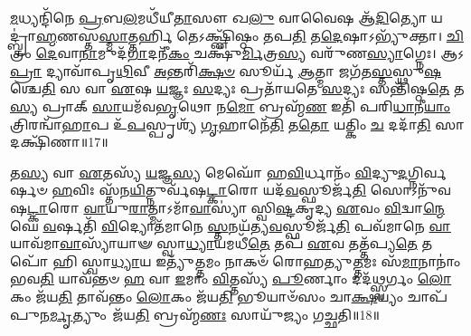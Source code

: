 \-\ul{𑌮}\-𑌧𑍍𑌯𑌨𑍍𑌦𑌿᳴𑌨𑍇 \ul{𑌪𑍍𑌰}\-𑌬\-\ul{𑌲}\-𑌮𑌧𑍀᳴𑌯𑍀\-\ul{𑌤𑌾}\-𑌸𑍗 𑌖\-\ul{𑌲𑍁} 𑌵𑌾𑌵𑍈𑌷 𑌆᳴\-\ul{𑌦𑌿}\-𑌤𑍍𑌯𑍋 𑌯𑌦𑍍𑌬𑍍𑌰𑌾॑\-\ul{𑌹𑍍𑌮}\-𑌣\-𑌸𑍍𑌤\-\ul{𑌸𑍍𑌮𑌾}\-𑌤𑍍𑌤𑌰𑍍\mbox{}\-\ul{𑌹𑌿} 𑌤𑍇𑌽𑌕𑍍𑌷𑍍𑌣𑌿᳴𑌷𑍍𑌠𑌂 𑌤𑌪\-\ul{𑌤𑌿} 𑌤\-\ul{𑌦𑍇}\-𑌷𑌾𑌽𑌭𑍍𑌯𑍁᳴𑌕𑍍𑌤𑌾। 
\-\ul{𑌚𑌿}\-𑌤𑍍𑌰𑌂 \ul{𑌦𑍇}\-𑌵𑌾\-\ul{𑌨𑌾}\-𑌮𑍁𑌦᳴\-\ul{𑌗𑌾}\-\-𑌦𑌨𑍀᳴\-\ul{𑌕𑌂} 𑌚𑌕𑍍𑌷𑍁᳴\-\ul{𑌰𑍍𑌮𑌿}\-𑌤𑍍𑌰\-\ul{𑌸𑍍𑌯} 𑌵𑌰𑍁᳴𑌣\-\ul{𑌸𑍍𑌯𑌾}\-𑌗𑍍𑌨𑍇𑌃। 
𑌆𑌽\-\ul{𑌪𑍍𑌰𑌾} 𑌦𑍍𑌯𑌾𑌵𑌾᳴𑌪𑍃\-\ul{𑌥𑌿}\-𑌵𑍀 \ul{𑌅}\-𑌨𑍍𑌤𑌰𑌿᳴\-\ul{𑌕𑍍𑌷}\-\-\ul{𑍞} 𑌸𑍂𑌰𑍍𑌯᳴ \ul{𑌆}\-𑌤𑍍𑌮𑌾 𑌜𑌗᳴𑌤\-\ul{𑌸𑍍𑌤}\-𑌸𑍍𑌥𑍁\-\ul{𑌷}\-𑌶𑍍𑌚𑍇\-\ul{𑌤𑌿} 𑌸 𑌵𑌾 \ul{𑌏}\-𑌷 \ul{𑌯}\-𑌜𑍍𑌞𑌃 \ul{𑌸}\-𑌦𑍍𑌯𑌃 𑌪𑍍𑌰𑌤𑌾᳴𑌯𑌤𑍇 \ul{𑌸}\-𑌦𑍍𑌯𑌃 𑌸𑌨𑍍𑌤𑌿᳴𑌷𑍍𑌠\-\ul{𑌤𑍇} 𑌤\-\ul{𑌸𑍍𑌯} 𑌪𑍍𑌰𑌾𑌕𑍍 \ul{𑌸𑌾}\-𑌯𑌮᳴𑌵\-\ul{𑌭𑍃}\-𑌥𑍋 𑌨\-\ul{𑌮𑍋} 𑌬𑍍𑌰𑌹𑍍𑌮᳴\-\ul{𑌣} 𑌇𑌤𑌿᳴ 𑌪𑌰𑌿\-\ul{𑌧𑌾}\-𑌨𑍀\-\ul{𑌯𑌾𑌂} 𑌤𑍍𑌰𑌿𑌰𑌨𑍍𑌵𑌾᳴\-\ul{𑌹𑌾}\-𑌪 𑌉᳴\-\ul{𑌪}\-𑌸𑍍𑌪𑍃𑌶𑍍𑌯᳴ \ul{𑌗𑍃}\-𑌹𑌾𑌨𑍇᳴\-\ul{𑌤𑌿} 𑌤\-\ul{𑌤𑍋} 𑌯𑌤𑍍𑌕𑌿𑌂 \ul{𑌚} 𑌦𑌦𑌾᳴\-\ul{𑌤𑌿} 𑌸𑌾 𑌦𑌕𑍍𑌷𑌿᳴𑌣𑌾॥17॥\anuvakamend


𑌤\-\ul{𑌸𑍍𑌯} 𑌵𑌾 \ul{𑌏}\-𑌤𑌸𑍍𑌯᳴ \ul{𑌯}\-𑌜𑍍𑌞\-\ul{𑌸𑍍𑌯} 𑌮𑍇𑌘𑍋᳴ 𑌹\-\ul{𑌵𑌿}\-𑌰𑍍𑌧𑌾𑌨𑌂᳴ \ul{𑌵𑌿}\-𑌦𑍍𑌯𑍁\-\ul{𑌦}\-𑌗𑍍𑌨𑌿𑌰𑍍\mbox{}\-\ul{𑌵}\-𑌰𑍍\mbox{}𑌷𑍞 \ul{𑌹}\-𑌵𑌿𑌃 𑌸𑍍𑌤᳴𑌨\-\ul{𑌯𑌿}\-𑌤𑍍𑌨𑍁𑌰𑍍𑌵᳴𑌷\-\ul{𑌟𑍍𑌕𑌾}\-𑌰𑍋 𑌯𑌦᳴\-\ul{𑌵}\-𑌸𑍍𑌫𑍂𑌰𑍍𑌜᳴\-\ul{𑌤𑌿} 𑌸𑍋𑌽𑌨𑍁᳴𑌵𑌷\-\ul{𑌟𑍍𑌕𑌾}\-𑌰𑍋 \ul{𑌵𑌾}\-𑌯𑍁\-\ul{𑌰𑌾}\-𑌤𑍍𑌮𑌾𑌽𑌮𑌾᳴\-\ul{𑌵𑌾}\-𑌸𑍍𑌯𑌾॑ 𑌸𑍍𑌵𑌿\-\ul{𑌷𑍍𑌟}\-𑌕𑍃𑌦𑍍𑌯 \ul{𑌏}\-𑌵𑌂 \ul{𑌵𑌿}\-𑌦𑍍𑌵𑌾\-\ul{𑌨𑍍𑌮𑍇}\-𑌘𑍇 \ul{𑌵}\-𑌰𑍍\mbox{}𑌷𑌤𑌿᳴ \ul{𑌵𑌿}\-𑌦𑍍𑌯𑍋𑌤᳴𑌮𑌾𑌨𑍇 \ul{𑌸𑍍𑌤}\-𑌨𑌯᳴𑌤𑍍𑌯\-\ul{𑌵}\-𑌸𑍍𑌫𑍂𑌰𑍍𑌜᳴\-\ul{𑌤𑌿} 𑌪𑌵᳴𑌮𑌾𑌨𑍇 \ul{𑌵𑌾}\-𑌯𑌾𑌵᳴𑌮𑌾\-\ul{𑌵𑌾}\-𑌸𑍍𑌯𑌾᳴𑌯𑌾𑍟 𑌸𑍍𑌵𑌾\-\ul{𑌧𑍍𑌯𑌾}\-𑌯𑌮𑌧𑍀᳴\-\ul{𑌤𑍇} 𑌤𑌪᳴ \ul{𑌏}\-𑌵 𑌤𑌤𑍍𑌤᳴𑌪𑍍𑌯\-\ul{𑌤𑍇} 𑌤𑌪𑍋᳴ 𑌹𑌿 𑌸𑍍𑌵𑌾\-\ul{𑌧𑍍𑌯𑌾}\-𑌯 𑌇𑌤𑍍𑌯𑍁᳴\-\ul{𑌤𑍍𑌤}\-𑌮𑌂 𑌨𑌾𑌕𑍞᳴ 𑌰𑍋𑌹𑌤𑍍𑌯𑍁\-\ul{𑌤𑍍𑌤}\-𑌮𑌃 𑌸᳴\-\ul{𑌮𑌾}\-𑌨𑌾𑌨𑌾𑌂॑ 𑌭𑌵\-\ul{𑌤𑌿} 𑌯𑌾𑌵᳴𑌨𑍍𑌤𑍞 \ul{𑌹} 𑌵𑌾 \ul{𑌇}\-𑌮𑌾𑌂 \ul{𑌵𑌿}\-𑌤𑍍𑌤𑌸𑍍𑌯᳴ \ul{𑌪𑍂}\-𑌰𑍍𑌣𑌾𑌂 𑌦𑌦᳴\-\ul{𑌥𑍍𑌸𑍍𑌵}\-𑌰𑍍𑌗𑌂 \ul{𑌲𑍋}\-𑌕𑌂 𑌜᳴𑌯\-\ul{𑌤𑌿} 𑌤𑌾𑌵᳴𑌨𑍍𑌤𑌂 \ul{𑌲𑍋}\-𑌕𑌂 𑌜᳴𑌯\-\ul{𑌤𑌿} 𑌭𑍂𑌯𑌾𑍞᳴𑌸𑌂 𑌚𑌾\-\ul{𑌕𑍍𑌷}\-𑌯𑍍𑌯𑌂 𑌚𑌾𑌪᳴ 𑌪𑍁𑌨\-\ul{𑌰𑍍𑌮𑍃}\-𑌤𑍍𑌯𑍁𑌂 𑌜᳴𑌯\-\ul{𑌤𑌿} 𑌬𑍍𑌰𑌹𑍍𑌮᳴\-\ul{𑌣𑌃} 𑌸𑌾𑌯𑍁᳴𑌜𑍍𑌯𑌂 𑌗𑌚𑍍𑌛𑌤𑌿॥18॥\anuvakamend


